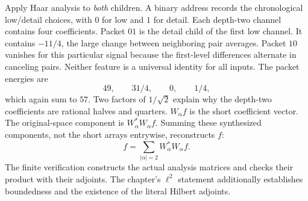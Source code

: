 Apply Haar analysis to \emph{both} children. A binary address records the chronological low/detail choices, with $0$ for low and $1$ for detail. Each depth-two channel contains four coefficients.
Packet $01$ is the detail child of the first low channel. It contains $-11/4$, the large change between neighboring pair averages. Packet $10$ vanishes for this particular signal because the first-level differences alternate in canceling pairs. Neither feature is a universal identity for all inputs.
The packet energies are
\[
49,\qquad 31/4,\qquad 0,\qquad 1/4,
\]
which again sum to $57$. Two factors of $1/\sqrt2$ explain why the depth-two coefficients are rational halves and quarters.
$W_\alpha f$ is the short coefficient vector. The original-space component is $W_\alpha^*W_\alpha f$. Summing these synthesized components, not the short arrays entrywise, reconstructs $f$:
\[
f=\sum_{|\alpha|=2}W_\alpha^*W_\alpha f.
\]
The finite verification constructs the actual analysis matrices and checks their product with their adjoints. The chapter's $\ell^2$ statement additionally establishes boundedness and the existence of the literal Hilbert adjoints.

